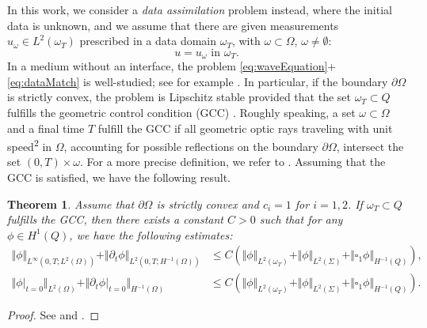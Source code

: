 \documentclass[sn-mathphys-num]{sn-jnl}
\newtheorem{thm}{Theorem}[section]
\numberwithin{equation}{section}
\newcommand{\dt}{\partial_t}
\begin{document}
In this work, we consider a \emph{data assimilation} problem instead, where the initial data is unknown, and we assume that there are given measurements $u_{\omega} \in L^2(\omega_T)$ prescribed in a data domain $\omega_T$, with $\omega \subset \Omega$, $\omega \not = \emptyset$:
\begin{equation}\label{eq:dataMatch}
    u = u_{\omega} \text{ in } \omega_T. \tag{DA}
\end{equation}
In a medium without an interface, the problem \eqref{eq:waveEquation}+\eqref{eq:dataMatch} is well-studied; see for example \cite{CM15,BFO20,BFMO21,MM21,DMS23,BDE24}. In particular, if the boundary $\partial \Omega$ is strictly convex, the problem is Lipschitz stable provided that the set $\omega_T \subset Q$ fulfills the geometric control condition (GCC) \cite{BLR92}. 
Roughly speaking, a set $\omega \subset \Omega$ and a final time $T$ fulfill the GCC if all geometric optic rays traveling with unit speed\textsuperscript{2}\footnotemark {} in $\Omega$, accounting for possible reflections on the boundary $\partial \Omega$, intersect the set $(0,T) \times \omega$. For a more precise definition, we refer to \cite{BLR92}. Assuming that the GCC is satisfied, we have the following result.

\begin{thm}\label{thm:Lipschitz}
    Assume that $\partial \Omega$ is strictly convex and $c_i = 1$ for $i = 1,2$. If $\omega_T \subset Q$ fulfills the GCC, then there exists a constant $C > 0$ such that for any $\phi \in H^1(Q)$, we have the following estimates:
    \begin{align*}
        \Vert \phi \Vert_{L^\infty(0,T;L^2(\Omega))} + \Vert \dt \phi \Vert_{L^2(0,T;H^{-1}(\Omega))} &\le C \left(  \Vert \phi \Vert_{L^2(\omega_T)} + \Vert \phi \Vert_{L^2(\Sigma)} + \Vert \square_1 \phi \Vert_{H^{-1}(Q)} \right), \\
        \Vert \phi \vert_{t = 0} \Vert_{L^2(\Omega)} + \Vert \dt \phi \vert_{t = 0} \Vert_{H^{-1}(\Omega)} &\le C \left(\Vert \phi \Vert_{L^2(\omega_T)} + \Vert \phi \Vert_{L^2(\Sigma)} + \Vert \square_1 \phi \Vert_{H^{-1}(Q)} \right). 
    \end{align*}
\end{thm}

\begin{proof}
    See \cite[Thm. A.4]{BFMO21control} and \cite[Rem. A.5]{BFMO21control}.
\end{proof}
\end{document}
